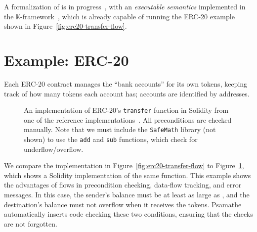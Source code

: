 \documentclass[dvipsnames,runningheads]{llncs}
\begin{document}


A formalization of \langName is in progress~\cite{psamatheRepo}, with an \emph{executable semantics} implemented in the $\mathbb{K}$-framework~\cite{rosu-serbanuta-2010-jlap}, which is already capable of running the ERC-20 example shown in Figure~\ref{fig:erc20-transfer-flow}.

\section{Example: ERC-20}\label{sec:erc20-impl}
Each ERC-20 contract manages the ``bank accounts'' for its own tokens, keeping track of how many tokens each account has; accounts are identified by addresses.
\begin{figure}
    \vspace{-2em}
    \centering
    
    \vspace{-1em}
    \caption{An implementation of ERC-20's \lstinline{transfer} function in Solidity from one of the reference implementations~\cite{erc20Consensys}.
        All preconditions are checked manually.
        Note that we must include the \lstinline{SafeMath} library (not shown) to use the \lstinline{add} and \lstinline{sub} functions, which check for underflow/overflow.}
    \label{fig:erc20-transfer-sol}
    \vspace{-2em}
\end{figure}
We compare the implementation in Figure~\ref{fig:erc20-transfer-flow} to Figure~\ref{fig:erc20-transfer-sol}, which shows a Solidity implementation of the same function.
This example shows the advantages of flows in precondition checking, data-flow tracking, and error messages.
In this case, the sender's balance must be at least as large as , and the destination's balance must not overflow when it receives the tokens.
Psamathe automatically inserts code checking these two conditions, ensuring that the checks are not forgotten.
\end{document}

